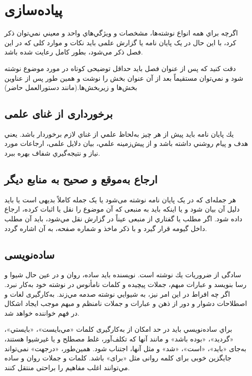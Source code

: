\chapter{پیاده‌سازی}

اگرچه براي همه انواع نوشته‌ها، مشخصات و ويژگي‌هاي واحد و معيني نمي‌توان ذكر كرد، با اين حال در یک پایان نامه یا گزارش علمی باید نکات و موارد کلی که در این فصل ذکر می‌شود، بطور کامل رعایت شده باشد. 

دقت كنيد كه پس از عنوان فصل بايد حداقل توضیحی کوتاه در مورد موضوع نوشته شود و نمي‌توان مستقيماً بعد از آن عنوان بخش را نوشت و همين طور پس از عناوين بخش‌ها و زيربخش‌ها.(مانند دستورالعمل حاضر)
\section{برخورداری از غنای علمی }

يك پایان نامه بايد پیش از هر چيز به‌لحاظ علمي از غناي لازم برخوردار باشد. يعني هدف و پيام روشني داشته باشد و از پيش‌زمينه علمي، بيان دلايل علمی، ارجاعات مورد نیاز و نتيجه‌گيري شفاف بهره ببرد. 

\section{ارجاع به‌موقع و صحیح به منابع دیگر}
هر جمله‌ای که در یک پایان نامه نوشته می‌شود یا یک جمله کاملاً بدیهی است یا باید دلیل آن بیان شود و یا اینکه باید به منبعی که آن موضوع را نقل یا اثبات کرده، ارجاع داده شود. اگر مطلب يا گفتاري از منبعی عيناً در گزارش نقل مي‌شود، بايد آن مطلب داخل گيومه قرار گيرد و با ذكر ماخذ و شماره صفحه، به آن اشاره گردد.


\section{ساده‌نویسی }
سادگی از ضروريات يك نوشته است. نويسنده بايد ساده، روان و در عين حال شيوا و رسا بنويسد و عبارات مبهم، جملات پيچيده و كلمات نامأنوس در نوشته خود به‌كار نبرد. اگر چه افراط در اين امر نيز، به شيوايي نوشته صدمه مي‌زند. به‌كارگیری لغات و اصطلاحات دشوار و دور از ذهن و عبارات و جملات نامنظم و مبهم موجب ايجاد اشكال در فهم خواننده خواهد شد‌. 

 براي ساده‌نويسي بايد در حد امكان از به‌كارگيری كلمات «مي‌بايست»، «بايستي»، «گرديد»، «بوده باشد» و مانند آنها كه تكلف‌آور، غلط مصطلح و يا غيرشيوا هستند، به‌جای «بايد»، «است»، «شد» و مثل آنها، اجتناب شود‌.‌ همين‌طور، «در‌جهت» نمی‌تواند جايگزين خوبی برای كلمه روانی مثل «برای» باشد‌. ‌كلمات و جملات روان و ساده مي‌توانند اغلب مفاهيم را براحتی منتقل كنند‌.‌
 
